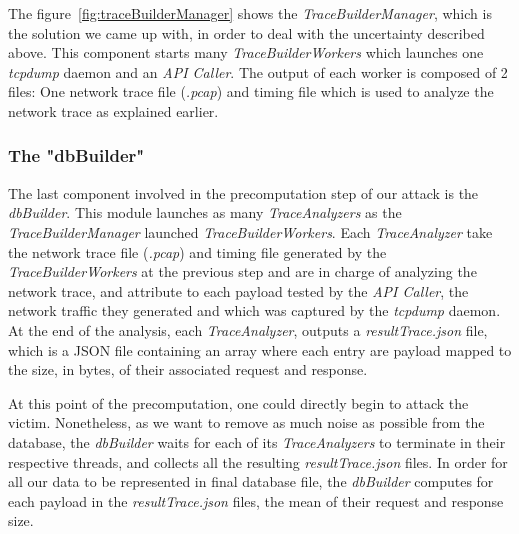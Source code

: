\documentclass[runningheads]{llncs}
\begin{document}
The figure~\ref{fig:traceBuilderManager} shows the \emph{TraceBuilderManager}, which is the solution we came up with, in order to deal with the uncertainty described above. This component starts many \emph{TraceBuilderWorkers} which launches one \emph{tcpdump} daemon and an \emph{API Caller}. The output of  each worker is composed of 2 files: One network trace file (\emph{.pcap}) and timing file which is used to analyze the network trace as explained earlier.

\bigskip

\subsubsection*{The "dbBuilder"}

The last component involved in the precomputation step of our attack is the \emph{dbBuilder}. This module launches as many \emph{TraceAnalyzers} as the \emph{TraceBuilderManager} launched \emph{TraceBuilderWorkers}.
Each \emph{TraceAnalyzer} take the network trace file (\emph{.pcap}) and timing file generated by the \emph{TraceBuilderWorkers} at the previous step and are in charge of analyzing the network trace, and attribute to each payload tested by the \emph{API Caller}, the network traffic they generated and which was captured by the \emph{tcpdump} daemon. At the end of the analysis, each \emph{TraceAnalyzer}, outputs a \emph{resultTrace.json} file, which is a JSON file containing an array where each entry are payload mapped to the size, in bytes, of their associated request and response.

\medskip

At this point of the precomputation, one could directly begin to attack the victim. Nonetheless, as we want to remove as much noise as possible from the database, the \emph{dbBuilder} waits for each of its \emph{TraceAnalyzers} to terminate in their respective threads, and collects all the resulting \emph{resultTrace.json} files. In order for all our data to be represented in final database file, the \emph{dbBuilder} computes for each payload in the \emph{resultTrace.json} files, the mean of their request and response size.
\end{document}
